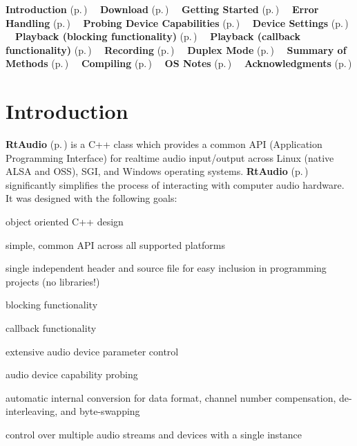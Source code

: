  

\begin{center}
 {\bf Introduction} {\rm (p.\,\pageref{intro})} \ \  {\bf Download} {\rm (p.\,\pageref{download})} \ \  {\bf Getting Started} {\rm (p.\,\pageref{start})} \ \  {\bf Error Handling} {\rm (p.\,\pageref{error})} \ \  {\bf Probing Device Capabilities} {\rm (p.\,\pageref{probing})} \ \  {\bf Device Settings} {\rm (p.\,\pageref{settings})} \ \  {\bf Playback (blocking functionality)} {\rm (p.\,\pageref{playbackb})} \ \  {\bf Playback (callback functionality)} {\rm (p.\,\pageref{playbackc})} \ \  {\bf Recording} {\rm (p.\,\pageref{recording})} \ \  {\bf Duplex Mode} {\rm (p.\,\pageref{duplex})} \ \  {\bf Summary of Methods} {\rm (p.\,\pageref{methods})} \ \  {\bf Compiling} {\rm (p.\,\pageref{compiling})} \ \  {\bf OS Notes} {\rm (p.\,\pageref{osnotes})} \ \  {\bf Acknowledgments} {\rm (p.\,\pageref{acknowledge})} \end{center}


\section{Introduction}\label{intro}


{\bf Rt\-Audio} {\rm (p.\,\pageref{classRtAudio})} is a C++ class which provides a common API (Application Programming Interface) for realtime audio input/output across Linux (native ALSA and OSS), SGI, and Windows operating systems. {\bf Rt\-Audio} {\rm (p.\,\pageref{classRtAudio})} significantly simplifies the process of interacting with computer audio hardware. It was designed with the following goals:

\begin{CompactItemize}
 \item 
object oriented C++ design \item 
simple, common API across all supported platforms \item 
single independent header and source file for easy inclusion in programming projects (no libraries!) \item 
blocking functionality \item 
callback functionality \item 
extensive audio device parameter control \item 
audio device capability probing \item 
automatic internal conversion for data format, channel number compensation, de-interleaving, and byte-swapping \item 
control over multiple audio streams and devices with a single instance \end{CompactItemize}


